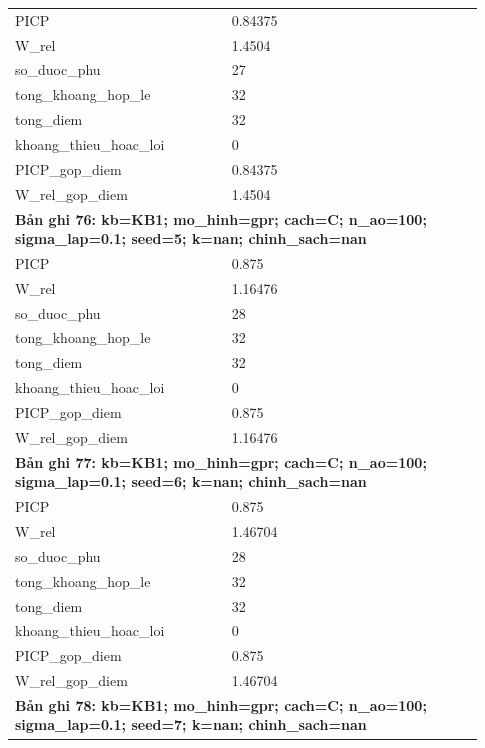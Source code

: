 \begin{longtable}{p{0.43\linewidth}p{0.50\linewidth}}
PICP & 0.84375 \\
W\_\allowbreak rel & 1.4504 \\
so\_\allowbreak duoc\_\allowbreak phu & 27 \\
tong\_\allowbreak khoang\_\allowbreak hop\_\allowbreak le & 32 \\
tong\_\allowbreak diem & 32 \\
khoang\_\allowbreak thieu\_\allowbreak hoac\_\allowbreak loi & 0 \\
PICP\_\allowbreak gop\_\allowbreak diem & 0.84375 \\
W\_\allowbreak rel\_\allowbreak gop\_\allowbreak diem & 1.4504 \\
\midrule
\multicolumn{2}{p{0.95\linewidth}}{\textbf{Bản ghi 76: kb=KB1; mo\_hinh=gpr; cach=C; n\_ao=100; sigma\_lap=0.1; seed=5; k=nan; chinh\_sach=nan}} \\
PICP & 0.875 \\
W\_\allowbreak rel & 1.16476 \\
so\_\allowbreak duoc\_\allowbreak phu & 28 \\
tong\_\allowbreak khoang\_\allowbreak hop\_\allowbreak le & 32 \\
tong\_\allowbreak diem & 32 \\
khoang\_\allowbreak thieu\_\allowbreak hoac\_\allowbreak loi & 0 \\
PICP\_\allowbreak gop\_\allowbreak diem & 0.875 \\
W\_\allowbreak rel\_\allowbreak gop\_\allowbreak diem & 1.16476 \\
\midrule
\multicolumn{2}{p{0.95\linewidth}}{\textbf{Bản ghi 77: kb=KB1; mo\_hinh=gpr; cach=C; n\_ao=100; sigma\_lap=0.1; seed=6; k=nan; chinh\_sach=nan}} \\
PICP & 0.875 \\
W\_\allowbreak rel & 1.46704 \\
so\_\allowbreak duoc\_\allowbreak phu & 28 \\
tong\_\allowbreak khoang\_\allowbreak hop\_\allowbreak le & 32 \\
tong\_\allowbreak diem & 32 \\
khoang\_\allowbreak thieu\_\allowbreak hoac\_\allowbreak loi & 0 \\
PICP\_\allowbreak gop\_\allowbreak diem & 0.875 \\
W\_\allowbreak rel\_\allowbreak gop\_\allowbreak diem & 1.46704 \\
\midrule
\multicolumn{2}{p{0.95\linewidth}}{\textbf{Bản ghi 78: kb=KB1; mo\_hinh=gpr; cach=C; n\_ao=100; sigma\_lap=0.1; seed=7; k=nan; chinh\_sach=nan}} \\

\end{longtable}
